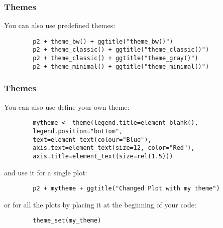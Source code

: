 \documentclass{beamer}
\begin{document}
	\begin{frame}[fragile]
		\frametitle{Themes}

		You can also use predefined themes:

		\begin{exampleblock}{}
		\begin{center}
		\begin{BVerbatim}
		p2 + theme_bw() + ggtitle("theme_bw()")
		p2 + theme_classic() + ggtitle("theme_classic()")
		p2 + theme_classic() + ggtitle("theme_gray()")
		p2 + theme_minimal() + ggtitle("theme_minimal()")
		\end{BVerbatim}
		\end{center}
		\end{exampleblock}{}

	\end{frame}

	\begin{frame}[fragile]
		\frametitle{Themes}

		You can also use define your own theme:

		\begin{exampleblock}{}
		\begin{center}
		\begin{BVerbatim}
		mytheme <- theme(legend.title=element_blank(),
		legend.position="bottom",
		text=element_text(colour="Blue"),
		axis.text=element_text(size=12, color="Red"),
		axis.title=element_text(size=rel(1.5)))
		\end{BVerbatim}
		\end{center}
		\end{exampleblock}{}

		and use it for a single plot:
		\begin{exampleblock}{}
		\begin{center}
		\begin{BVerbatim}
		p2 + mytheme + ggtitle("Changed Plot with my theme")
		\end{BVerbatim}
		\end{center}
		\end{exampleblock}{}

		or for all the plots by placing it at the beginning of your code:

		\begin{exampleblock}{}
		\begin{center}
		\begin{BVerbatim}
		theme_set(my_theme)
		\end{BVerbatim}
		\end{center}
		\end{exampleblock}{}

	\end{frame}
\end{document}
